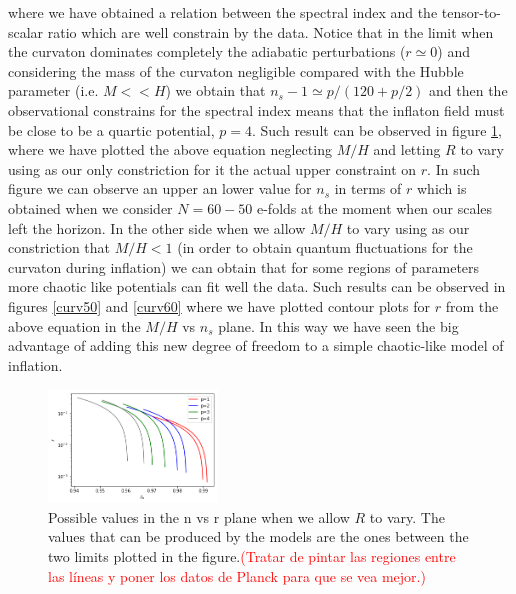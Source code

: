 \documentclass[twocolumn,           %
               showpacs,            %
               preprintnumbers,     %
               aps,                 %
               prl,          	    %
               letterpaper,             %
               superscriptaddress,      %
               nofootinbib,         %
               tightenlines,        %
               floats,floatfix      %
               ,usenatbib,
               ]{revtex4-1}
\begin{document}
where we have obtained a relation between the spectral index and the tensor-to-scalar ratio which are well constrain by the data. Notice that in the limit when the curvaton dominates completely the adiabatic perturbations ($r\simeq 0$) and considering the mass of the curvaton negligible compared with the Hubble parameter (i.e. $M<<H$) we obtain that $n_s-1\simeq p/(120+p/2)$ and then the observational constrains for the spectral index means that the inflaton field must be close to be a quartic potential, $p=4$. Such result can be observed in figure \ref{nvsr}, where we have plotted the above equation neglecting $M/H$ and letting $R$ to vary using as our only constriction for it the actual upper constraint on $r$. In such figure we can observe an upper an lower value for $n_s$ in terms of $r$ which is obtained when we consider $N=60-50$ e-folds at the moment when our scales left the horizon. In the other side when we allow $M/H$ to vary using as our constriction that $M/H<1$ (in order to obtain quantum fluctuations for the curvaton during inflation) we can obtain that for some regions of parameters more chaotic like potentials can fit well the data. Such results can be observed in figures \ref{curv50} and \ref{curv60} where we have plotted contour plots for $r$ from the above equation in the $M/H$ vs $n_s$ plane. In this way we have seen the big advantage of adding this new degree of freedom to a simple chaotic-like model of inflation.
\begin{figure}
\centering
\includegraphics[width=0.4\textwidth]{nvsr}
\caption{Possible values in the n vs r plane when we allow $R$ to vary. The values that can be produced by the models are the ones between the two limits plotted in the figure.\textcolor{red}{(Tratar de pintar las regiones entre las l\'ineas y poner los datos de Planck para que se vea mejor.)}}
\label{nvsr}
\end{figure}
%
\newpage
\end{document}
